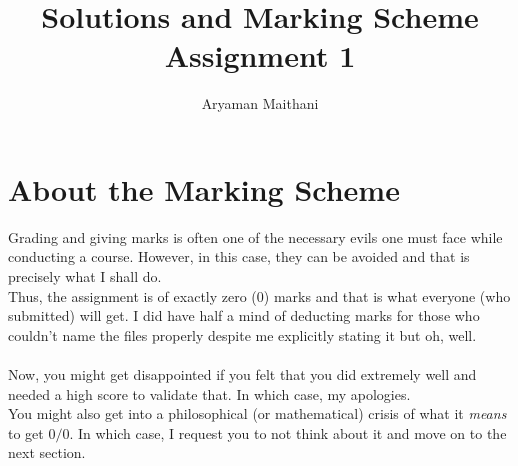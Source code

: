 \documentclass{article}
\title{Solutions and Marking Scheme\\Assignment 1}	%
\author{Aryaman Maithani}
\date{ }
\begin{document}
\maketitle

\hrulefill

\section{About the Marking Scheme}
Grading and giving marks is often one of the necessary evils one must face while conducting a course. However, in this case, they can be avoided and that is precisely what I shall do.\\
Thus, the assignment is of exactly zero (0) marks and that is what everyone (who submitted) will get. I did have half a mind of deducting marks for those who couldn't name the files properly despite me explicitly stating it but oh, well.\\\\
Now, you might get disappointed if you felt that you did extremely well and needed a high score to validate that. In which case, my apologies.\\
You might also get into a philosophical (or mathematical) crisis of what it \emph{means} to get $0/0.$ In which case, I request you to not think about it and move on to the next section.

\hrulefill
\end{document}
